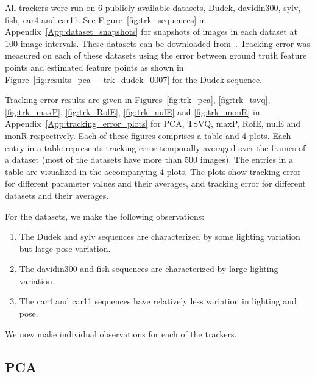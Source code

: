All trackers were run on 6 publicly available datasets, Dudek, davidin300, sylv, fish, car4 and car11.  See Figure~\ref{fig:trk_sequences} in Appendix~\ref{App:dataset_snapshots} for snapshots of images in each dataset at 100 image intervals.  These datasets can be downloaded from~\cite{2008_JNL_subspaceTRK_Ross}.  Tracking error was measured on each of these datasets using the error between ground truth feature points and estimated feature points as shown in Figure~\ref{fig:results_pca__trk_dudek_0007} for the Dudek sequence.

Tracking error results are given in Figures~\ref{fig:trk_pca}, \ref{fig:trk_tsvq}, \ref{fig:trk_maxP}, \ref{fig:trk_RofE}, \ref{fig:trk_nulE} and \ref{fig:trk_monR} in Appendix~\ref{App:tracking_error_plots} for PCA, TSVQ, maxP, RofE, nulE and monR respectively.  Each of these figures comprises a table and 4 plots.  Each entry in a table represents tracking error temporally averaged over the frames of a dataset (most of the datasets have more than 500 images).  The entries in a table are visualized in the accompanying 4 plots.  The plots show tracking error for different parameter values and their averages, and tracking error for different datasets and their averages.  

For the datasets, we make the following observations:

\begin{enumerate}
\item The Dudek and sylv sequences are characterized by some lighting variation but large pose variation.
\item The davidin300 and fish sequences are characterized by large lighting variation.
\item The car4 and car11 sequences have relatively less variation in lighting and pose.
\end{enumerate}

We now make individual observations for each of the trackers.

\subsection{PCA}

